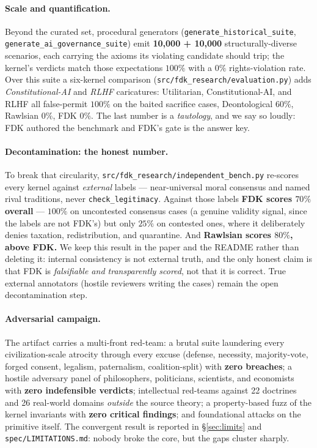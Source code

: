 \documentclass[11pt]{article}
\begin{document}
\paragraph{Scale and quantification.} Beyond the curated set, procedural generators
(\texttt{generate\_historical\_suite}, \texttt{generate\_ai\_governance\_suite}) emit
\textbf{10{,}000 + 10{,}000} structurally-diverse scenarios, each carrying the axioms its
violating candidate should trip; the kernel's verdicts match those expectations $100\%$ with a
$0\%$ rights-violation rate. Over this suite a six-kernel comparison
(\texttt{src/fdk\_research/evaluation.py}) adds \emph{Constitutional-AI} and \emph{RLHF}
caricatures: Utilitarian, Constitutional-AI, and RLHF all false-permit $100\%$ on the baited
sacrifice cases, Deontological $60\%$, Rawlsian $0\%$, FDK $0\%$. The last number is a
\emph{tautology}, and we say so loudly: FDK authored the benchmark and FDK's gate is the answer
key.

\paragraph{Decontamination: the honest number.} To break that circularity,
\texttt{src/fdk\_research/independent\_bench.py} re-scores every kernel against \emph{external}
labels --- near-universal moral consensus and named rival traditions, never
\texttt{check\_legitimacy}. Against those labels \textbf{FDK scores $70\%$ overall} --- $100\%$
on uncontested consensus cases (a genuine validity signal, since the labels are not FDK's) but
only $25\%$ on contested ones, where it deliberately denies taxation, redistribution, and
quarantine. And \textbf{Rawlsian scores $80\%$, above FDK.} We keep this result in the paper and
the README rather than deleting it: internal consistency is not external truth, and the only
honest claim is that FDK is \emph{falsifiable and transparently scored}, not that it is correct.
True external annotators (hostile reviewers writing the cases) remain the open decontamination
step.

\paragraph{Adversarial campaign.} The artifact carries a multi-front red-team: a brutal suite
laundering every civilization-scale atrocity through every excuse (defense, necessity,
majority-vote, forged consent, legalism, paternalism, coalition-split) with \textbf{zero
breaches}; a hostile adversary panel of philosophers, politicians, scientists, and economists
with \textbf{zero indefensible verdicts}; intellectual red-teams against 22 doctrines and 26
real-world domains \emph{outside} the source theory; a property-based fuzz of the kernel
invariants with \textbf{zero critical findings}; and foundational attacks on the primitive
itself. The convergent result is reported in \S\ref{sec:limits} and
\texttt{spec/LIMITATIONS.md}: nobody broke the core, but the gaps cluster sharply.
\end{document}
